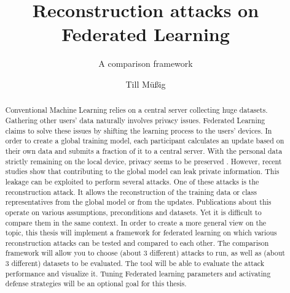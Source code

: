 \documentclass[
	ngerman,
	ruledheaders=section,%
	class=report,%
	thesis={type=bachelor},%
	accentcolor=1b,%
	custommargins=true,%
	marginpar=false,%
	parskip=half-,%
	fontsize=11pt,%
]{tudapub}
\begin{document}

\title{Reconstruction attacks on Federated Learning}
\subtitle{A comparison framework}
\author[T. Müßig]{Till Müßig}%


\submissiondate{\today}
\examdate{\today}


\maketitle

\begin{abstract}
Conventional Machine Learning relies on a central server collecting huge datasets. Gathering other users' data naturally involves privacy issues. Federated Learning claims to solve these issues by shifting the learning process to the users' devices. In order to create a global training model, each participant calculates an update based on their own data and submits a fraction of it to a central server. With the personal data strictly remaining on the local device, privacy seems to be preserved \cite{kairouz2019advances}. However, recent studies show that contributing to the global model can leak private information. This leakage can be exploited to perform several attacks. One of these attacks is the reconstruction attack. It allows the reconstruction of the training data or class representatives from the global model or from the updates. Publications about this operate on various assumptions, preconditions and datasets. Yet it is difficult to compare them in the same context. In order to create a more general view on the topic, this thesis will implement a framework for federated learning on which various reconstruction attacks can be tested and compared to each other. The comparison framework will allow you to choose (about 3 different) attacks to run, as well as (about 3 different) datasets to be evaluated. The tool will be able to evaluate the attack performance and visualize it. Tuning Federated learning parameters and activating defense strategies will be an optional goal for this thesis. 
\end{abstract}
\end{document}
